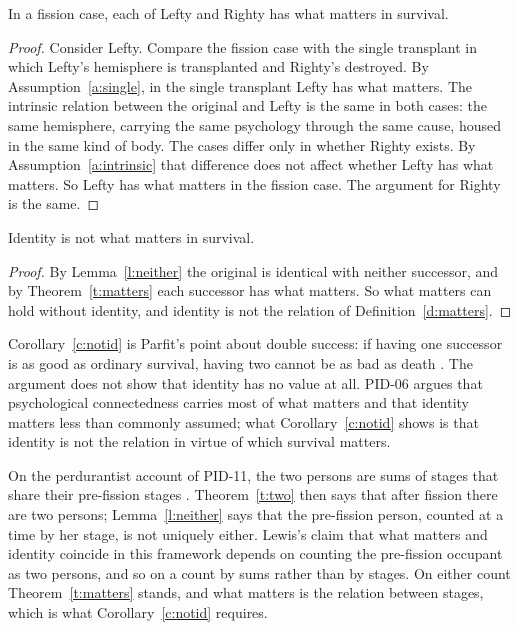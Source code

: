\documentclass{situationist-preprint}
\begin{document}
\begin{theorem}\label{t:matters}
In a fission case, each of Lefty and Righty has what matters in survival.
\end{theorem}

\begin{proof}
Consider Lefty. Compare the fission case with the single transplant in which Lefty's hemisphere is transplanted and Righty's destroyed. By Assumption~\ref{a:single}, in the single transplant Lefty has what matters. The intrinsic relation between the original and Lefty is the same in both cases: the same hemisphere, carrying the same psychology through the same cause, housed in the same kind of body. The cases differ only in whether Righty exists. By Assumption~\ref{a:intrinsic} that difference does not affect whether Lefty has what matters. So Lefty has what matters in the fission case. The argument for Righty is the same.
\end{proof}

\begin{corollary}\label{c:notid}
Identity is not what matters in survival.
\end{corollary}

\begin{proof}
By Lemma~\ref{l:neither} the original is identical with neither successor, and by Theorem~\ref{t:matters} each successor has what matters. So what matters can hold without identity, and identity is not the relation of Definition~\ref{d:matters}.
\end{proof}

Corollary~\ref{c:notid} is Parfit's point about double success: if having one successor is as good as ordinary survival, having two cannot be as bad as death \citep[ch.~12]{Parfit1984}. The argument does not show that identity has no value at all. PID-06 argues that psychological connectedness carries most of what matters and that identity matters less than commonly assumed; what Corollary~\ref{c:notid} shows is that identity is not the relation in virtue of which survival matters.

\begin{remark}\label{r:perd}
On the perdurantist account of PID-11, the two persons are sums of stages that share their pre-fission stages \citep{Lewis1976}. Theorem~\ref{t:two} then says that after fission there are two persons; Lemma~\ref{l:neither} says that the pre-fission person, counted at a time by her stage, is not uniquely either. Lewis's claim that what matters and identity coincide in this framework depends on counting the pre-fission occupant as two persons, and so on a count by sums rather than by stages. On either count Theorem~\ref{t:matters} stands, and what matters is the relation between stages, which is what Corollary~\ref{c:notid} requires.
\end{remark}
\end{document}
